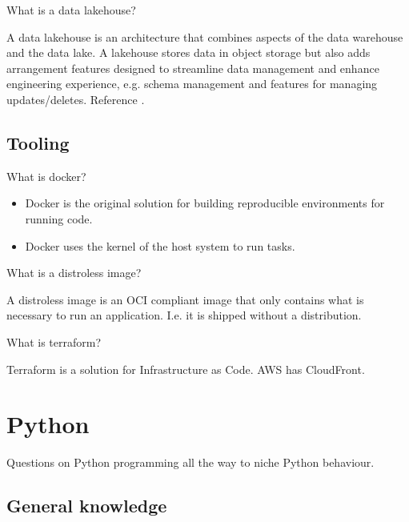 \begin{questions}
\question What is a data lakehouse?
\begin{solution}
A data lakehouse is an architecture that combines aspects of the data warehouse and the data lake. A lakehouse stores data in object storage but also adds arrangement features designed to streamline data management and enhance engineering experience, e.g. schema management and features for managing updates/deletes.
Reference \cite[p.~220]{fode}.
\end{solution}
\end{questions}

\subsection{Tooling}

\begin{questions}
\question[1] What is docker?
\begin{solution}
\begin{itemize}
    \item Docker is the original solution for building reproducible environments for running code.
    \item Docker uses the kernel of the host system to run tasks. 
\end{itemize}
\end{solution}

\question[2] What is a distroless image?
\begin{solution} 
\item A distroless image is an OCI compliant image that only contains what is necessary to run an application. I.e. it is shipped without a distribution.
\end{solution}

\question[1] What is terraform?
\begin{solution}
Terraform is a solution for Infrastructure as Code. AWS has CloudFront.
\end{solution}
\end{questions}

\section{Python}

Questions on Python programming all the way to niche Python behaviour.

\subsection{General knowledge}

